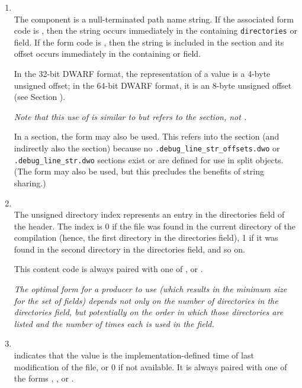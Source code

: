 \begin{enumerate}[1. ]

\item  \DWLNCTpathTARG \\
The component is a null-terminated path name string.
If the associated form code is \DWFORMstring{}, then the
string occurs immediately in the containing \texttt{directories}
or  field. If the form code is \DWFORMlinestrp{},
then the string is included in the \dotdebuglinestr{} section
and its offset occurs immediately in the containing
 or  field.

In the 32-bit DWARF format, the representation of a
\DWFORMlinestrp{} value is a 4-byte unsigned offset; in the
64-bit DWARF format, it is an 8-byte unsigned offset (see
Section ).

\textit{Note that this use of \DWFORMlinestrp{} is similar to
\DWFORMstrp{} but refers to the \dotdebuglinestr{} section,
not \dotdebugstr.}
   
In a \dotdebuglinedwo{} section, the form \DWFORMstrx{} may
also be used. This refers into the \dotdebugstroffsetsdwo{}
section (and indirectly also the \dotdebugstrdwo{} section)
because no \texttt{.debug\_line\_str\_offsets.dwo} or 
\texttt{.debug\_line\_str.dwo} sections exist or are defined for 
use in split objects. (The form \DWFORMstring{} may also be used, 
but this precludes the benefits of string sharing.)
   
\item \DWLNCTdirectoryindexTARG \\
The unsigned directory index represents an entry in the
directories field of the header. The index is 0 if
the file was found in the current directory of the compilation
(hence, the first directory in the directories field),
1 if it was found in the second directory in the directories
field, and so on.

This content code is always paired with one of \DWFORMdataone, 
\DWFORMdatatwo{} or \DWFORMudata.

\textit{The optimal form for a producer to use (which results in the
minimum size for the set of  fields) depends not only
on the number of directories in the directories
field, but potentially on the order in which those directories are
listed and the number of times each is used in the  field.}

\item \DWLNCTtimestampTARG \\
\DWLNCTtimestampNAME{} indicates that the value is the implementation-defined 
time of last modification of the file, or 0 if not available. 
It is always paired with one of the forms
\DWFORMudata, \DWFORMdatafour, \DWFORMdataeight{} or \DWFORMblock.
   

\end{enumerate}
